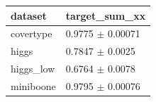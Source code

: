 \begin{tabular}{ll}
\toprule
dataset & target\_sum\_xx \\
\midrule
covertype & 0.9775 $\pm$ 0.00071 \\
higgs & 0.7847 $\pm$ 0.0025 \\
higgs\_low & 0.6764 $\pm$ 0.0078 \\
miniboone & 0.9795 $\pm$ 0.00076 \\
\bottomrule
\end{tabular}

